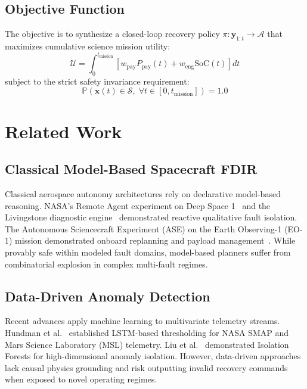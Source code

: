 \documentclass[10pt,twocolumn]{article}
\begin{document}
\subsection{Objective Function}
The objective is to synthesize a closed-loop recovery policy $\pi: \mathbf{y}_{1:t} \to \mathcal{A}$ that maximizes cumulative science mission utility:
\begin{equation}
\mathcal{U} = \int_{0}^{t_{\text{mission}}} \left[ w_{\text{pay}} P_{\text{pay}}(t) + w_{\text{eng}} \text{SoC}(t) \right] dt
\end{equation}
subject to the strict safety invariance requirement:
\begin{equation}
\mathbb{P}\left(\mathbf{x}(t) \in \mathcal{S}, \;\forall t \in [0, t_{\text{mission}}]\right) = 1.0
\end{equation}

\section{Related Work}

\subsection{Classical Model-Based Spacecraft FDIR}
Classical aerospace autonomy architectures rely on declarative model-based reasoning. NASA's Remote Agent experiment on Deep Space 1~\cite{muscettola1998remote} and the Livingstone diagnostic engine~\cite{williams2003model} demonstrated reactive qualitative fault isolation. The Autonomous Sciencecraft Experiment (ASE) on the Earth Observing-1 (EO-1) mission demonstrated onboard replanning and payload management~\cite{chien2005autonomous}. While provably safe within modeled fault domains, model-based planners suffer from combinatorial explosion in complex multi-fault regimes.

\subsection{Data-Driven Anomaly Detection}
Recent advances apply machine learning to multivariate telemetry streams. Hundman et al.~\cite{hundman2018detecting} established LSTM-based thresholding for NASA SMAP and Mars Science Laboratory (MSL) telemetry. Liu et al.~\cite{liu2008isolation} demonstrated Isolation Forests for high-dimensional anomaly isolation. However, data-driven approaches lack causal physics grounding and risk outputting invalid recovery commands when exposed to novel operating regimes.
\end{document}
